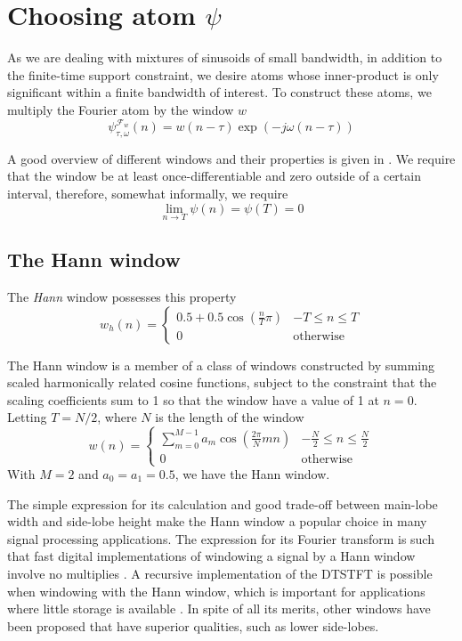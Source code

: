\section{Choosing atom $\psi$ \label{sec:optblackman}}


As we are dealing with mixtures of sinusoids of small bandwidth, in addition to
the finite-time support constraint, we desire atoms whose inner-product is only
significant within a finite bandwidth of interest. To construct these atoms, we
multiply the Fourier atom by the window $w$
\[
    \psi_{\tau,\omega}^{\mathcal{F}_{w}}(n) = w(n-\tau) \exp(-j\omega(n-\tau))
\]

A good overview of different windows and their properties is given in
\cite{harris1978use}. We require that the window be at least
once-differentiable and zero outside of a certain interval, therefore, somewhat
informally, we require
\[
    \lim_{n \rightarrow T} \psi(n) = \psi(T) = 0
\]

\subsection{The Hann window}

The \textit{Hann} window possesses this property
\[
    w_{h}(n) = \begin{cases}
        0.5 + 0.5 \cos \left( \frac{n}{T}\pi \right) & -T \leq n \leq T \\
        0 & \text{otherwise}
    \end{cases}
\]

The Hann window is a member of a class of windows constructed by summing scaled
harmonically related cosine functions, subject to the constraint that the
scaling coefficients sum to 1 so that the window have a value of 1 at $n=0$.
Letting $T=N/2$, where $N$ is the length of the window
\[
    w(n) = \begin{cases}
        \sum_{m=0}^{M-1}a_{m}\cos \left( \frac{2\pi}{N}mn \right) & -\frac{N}{2} \leq n
        \leq \frac{N}{2} \\
        0 & \text{otherwise}
    \end{cases}
\]
With $M=2$ and $a_0 = a_1 = 0.5$, we have the Hann window.

The simple expression for its calculation and good trade-off between main-lobe
width and side-lobe height make the Hann window a popular choice in many signal
processing applications. The expression for its Fourier transform is such that
fast digital implementations of windowing a signal by a Hann window involve no
multiplies \cite[p.~183]{harris1978use}. A recursive implementation of the
DTSTFT is possible when windowing with the Hann window, which is important for
applications where little storage is available \cite[p.~102]{stankovic2014time}.
In spite of all its merits, other windows have been proposed that have superior
qualities, such as lower side-lobes.

